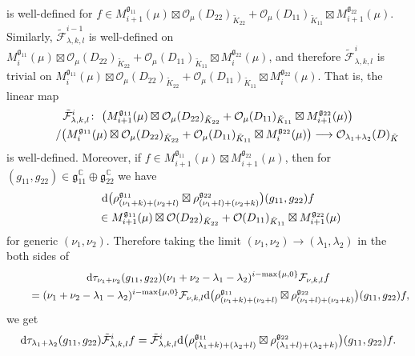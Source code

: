 \documentclass[pdftex]{sigma}
\numberwithin{equation}{section}
\newcommand{\BC}{\mathbb{C}}
\newcommand{\fg}{\mathfrak{g}}
\newcommand{\cF}{\mathcal{F}}
\newcommand{\cO}{\mathcal{O}}
\begin{document}
is well-defined for $f\in M_{i+1}^{\fg_{11}}(\mu)\boxtimes \cO_{\mu}(D_{22})_{\tilde{K}_{22}} +\cO_{\mu}(D_{11})_{\tilde{K}_{11}}\boxtimes M_{i+1}^{\fg_{22}}(\mu)$. Similarly, $\tilde{\cF}^{i-1}_{\lambda,k,l}$ is well-defined on $M_{i}^{\fg_{11}}(\mu)\boxtimes \cO_{\mu}(D_{22})_{\tilde{K}_{22}} +\cO_{\mu}(D_{11})_{\tilde{K}_{11}}\boxtimes M_{i}^{\fg_{22}}(\mu)$, and therefore $\tilde{\cF}^i_{\lambda,k,l}$ is trivial on $M_i^{\fg_{11}}(\mu)\boxtimes \cO_{\mu}(D_{22})_{\tilde{K}_{22}}+\cO_{\mu}(D_{11})_{\tilde{K}_{11}}\boxtimes M_i^{\fg_{22}}(\mu)$. That is, the linear map
\begin{gather*}
\tilde{\cF}^i_{\lambda,k,l}\colon \
\big(M_{i+1}^{\fg_{11}}(\mu)\boxtimes \cO_{\mu}(D_{22})_{\tilde{K}_{22}}+\cO_{\mu}(D_{11})_{\tilde{K}_{11}}\boxtimes M_{i+1}^{\fg_{22}}(\mu)\big)\\
\hphantom{\tilde{\cF}^i_{\lambda,k,l}\colon}{} \ /\big(M_i^{\fg_{11}}(\mu)\boxtimes \cO_{\mu}(D_{22})_{\tilde{K}_{22}}+\cO_{\mu}(D_{11})_{\tilde{K}_{11}}\boxtimes M_i^{\fg_{22}}(\mu)\big)
\longrightarrow \cO_{\lambda_1+\lambda_2}(D)_{\tilde{K}}
\end{gather*}
is well-defined. Moreover, if $f\in M_{i+1}^{\fg_{11}}(\mu)\boxtimes M_{i+1}^{\fg_{22}}(\mu)$, then for $(g_{11},g_{22})\in\fg_{11}^\BC\oplus\fg_{22}^\BC$ we have
\begin{gather*}
{\rm d}\big(\rho_{(\nu_1+k)+(\nu_2+l)}^{\fg_{11}}\boxtimes \rho_{(\nu_1+l)+(\nu_2+k)}^{\fg_{22}}\big)(g_{11},g_{22})f \\
 \qquad{} \in M_{i+1}^{\fg_{11}}(\mu)\boxtimes \cO(D_{22})_{\tilde{K}_{22}}+\cO(D_{11})_{\tilde{K}_{11}}\boxtimes M_{i+1}^{\fg_{22}}(\mu)
\end{gather*}
for generic $(\nu_1,\nu_2)$. Therefore taking the limit $(\nu_1,\nu_2)\to(\lambda_1,\lambda_2)$ in the both sides of
\begin{gather*}
 {\rm d}\tau_{\nu_1+\nu_2}(g_{11},g_{22})(\nu_1+\nu_2-\lambda_1-\lambda_2)^{i-\max\{\mu,0\}}\cF_{\nu,k,l}f \\
\qquad{} =(\nu_1+\nu_2-\lambda_1-\lambda_2)^{i-\max\{\mu,0\}}\cF_{\nu,k,l}
{\rm d}\big(\rho_{(\nu_1+k)+(\nu_2+l)}^{\fg_{11}}\boxtimes \rho_{(\nu_1+l)+(\nu_2+k)}^{\fg_{22}}\big)(g_{11},g_{22})f,
\end{gather*}
we get
\begin{gather*} {\rm d}\tau_{\lambda_1+\lambda_2}(g_{11},g_{22})\tilde{\cF}_{\lambda,k,l}^if
=\tilde{\cF}_{\lambda,k,l}^i
{\rm d}\big(\rho_{(\lambda_1+k)+(\lambda_2+l)}^{\fg_{11}}\boxtimes \rho_{(\lambda_1+l)+(\lambda_2+k)}^{\fg_{22}}\big)(g_{11},g_{22})f. \end{gather*}
\end{document}
